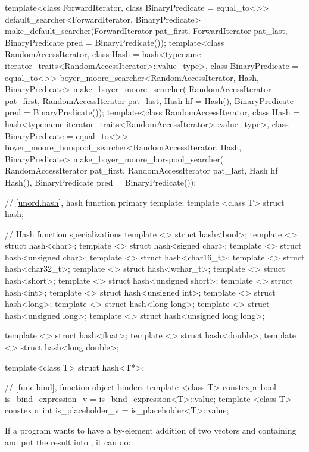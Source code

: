 \begin{codeblock}
{  template<class ForwardIterator, class BinaryPredicate = equal_to<>>
  default_searcher<ForwardIterator, BinaryPredicate>
  make_default_searcher(ForwardIterator pat_first, ForwardIterator pat_last,
                        BinaryPredicate pred = BinaryPredicate());
  template<class RandomAccessIterator,
           class Hash = hash<typename iterator_traits<RandomAccessIterator>::value_type>,
           class BinaryPredicate = equal_to<>>
  boyer_moore_searcher<RandomAccessIterator, Hash, BinaryPredicate>
  make_boyer_moore_searcher(
      RandomAccessIterator pat_first, RandomAccessIterator pat_last,
      Hash hf = Hash(), BinaryPredicate pred = BinaryPredicate());
  template<class RandomAccessIterator,
           class Hash = hash<typename iterator_traits<RandomAccessIterator>::value_type>,
           class BinaryPredicate = equal_to<>>
  boyer_moore_horspool_searcher<RandomAccessIterator, Hash, BinaryPredicate>
  make_boyer_moore_horspool_searcher(
      RandomAccessIterator pat_first, RandomAccessIterator pat_last,
      Hash hf = Hash(), BinaryPredicate pred = BinaryPredicate());

  // \ref{unord.hash}, hash function primary template:
  template <class T> struct hash;

  // Hash function specializations
  template <> struct hash<bool>;
  template <> struct hash<char>;
  template <> struct hash<signed char>;
  template <> struct hash<unsigned char>;
  template <> struct hash<char16_t>;
  template <> struct hash<char32_t>;
  template <> struct hash<wchar_t>;
  template <> struct hash<short>;
  template <> struct hash<unsigned short>;
  template <> struct hash<int>;
  template <> struct hash<unsigned int>;
  template <> struct hash<long>;
  template <> struct hash<long long>;
  template <> struct hash<unsigned long>;
  template <> struct hash<unsigned long long>;

  template <> struct hash<float>;
  template <> struct hash<double>;
  template <> struct hash<long double>;

  template<class T> struct hash<T*>;

  // \ref{func.bind}, function object binders
  template <class T> constexpr bool is_bind_expression_v
    = is_bind_expression<T>::value;
  template <class T> constexpr int is_placeholder_v
    = is_placeholder<T>::value;
}
\end{codeblock}

\pnum
\enterexample
If a \Cpp program wants to have a by-element addition of two vectors 
and  containing  and put the result into ,
it can do:

